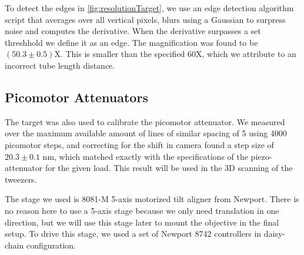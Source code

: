 To detect the edges in \cref{fig:resolutionTarget}, we use an edge detection algorithm script that averages over all vertical pixels, blurs using a Gaussian to surpress noise and computes the derivative. When the derivative surpasses a set threshhold we define it as an edge. The magnification was found to be $(50.3\pm0.5)$X. This is smaller than the specified 60X, which we attribute to an incorrect tube length distance. 

\subsection{Picomotor Attenuators}

The target was also used to calibrate the picomotor attenuator. We measured over the maximum available amount of lines of similar spacing of 5 using 4000 picomotor steps, and correcting for the shift in camera found a step size of $20.3\pm0.1$ nm, which matched exactly with the specifications of the piezo-attenuator for the given load. This result will be used in the 3D scanning of the tweezers. 

The stage we used is 8081-M 5-axis motorized tilt aligner from Newport. There is no reason here to use a 5-axis stage because we only need translation in one direction, but we will use this stage later to mount the objective in the final setup. To drive this stage, we used a set of Newport 8742 controllers in daisy-chain configuration. 
